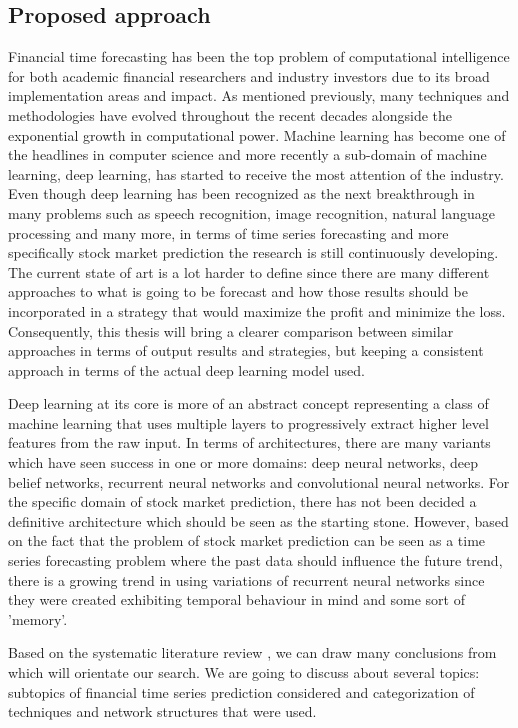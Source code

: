 \subsection{Proposed approach}
Financial time forecasting has been the top problem of computational intelligence for both academic financial researchers and industry investors due to its broad implementation areas and impact. As mentioned previously, many techniques and methodologies have evolved throughout the recent decades alongside the exponential growth in computational power. Machine learning has become one of the headlines in computer science and more recently a sub-domain of machine learning, deep learning, has started to receive the most attention of the industry. Even though deep learning has been recognized as the next breakthrough in many problems such as speech recognition, image recognition, natural language processing and many more, in terms of time series forecasting and more specifically stock market prediction the research is still continuously developing. The current state of art is a lot harder to define since there are many different approaches to what is going to be forecast and how those results should be incorporated in a strategy that would maximize the profit and minimize the loss. Consequently, this thesis will bring a clearer comparison between similar approaches in terms of output results and strategies, but keeping a consistent approach in terms of the actual deep learning model used.

Deep learning at its core is more of an abstract concept representing a class of machine learning that uses multiple layers to progressively extract higher level features from the raw input. In terms of architectures, there are many variants which have seen success in one or more domains: deep neural networks, deep belief networks, recurrent neural networks and convolutional neural networks. For the specific domain of stock market prediction, there has not been decided a definitive architecture which should be seen as the starting stone. However, based on the fact that the problem of stock market prediction can be seen as a time series forecasting problem where the past data should influence the future trend, there is a growing trend in using variations of recurrent neural networks since they were created exhibiting temporal behaviour in mind and some sort of 'memory'. 

\vspace{5mm}

Based on the systematic literature review \cite{sezer2020financial}, we can draw many conclusions from which will orientate our search. We are going to discuss about several topics: subtopics of financial time series prediction considered and categorization of techniques and network structures that were used.

